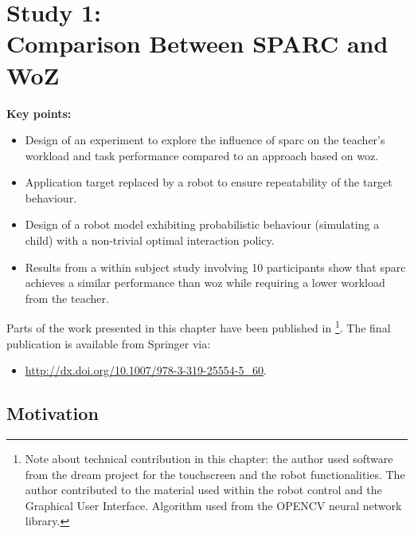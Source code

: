 \chapter[Study 1: Comparison Between SPARC and WoZ]{Study 1: \\ Comparison Between SPARC and WoZ}\label{chap:woz}
\glsresetall
\graphicspath{{images/woz/}}

\begin{framed}
	\textbf{Key points:}
	
	\begin{itemize}
		\item Design of an experiment to explore the influence of \acrshort{sparc} on the teacher's workload and task performance compared to an approach based on \acrshort{woz}.
		\item Application target replaced by a robot to ensure repeatability of the target behaviour.
		\item Design of a robot model exhibiting probabilistic behaviour (simulating a child) with a non-trivial optimal interaction policy.
		\item Results from a within subject study involving 10 participants show that \acrshort{sparc} achieves a similar performance than \acrshort{woz} while requiring a lower workload from the teacher.
	\end{itemize}
\end{framed}

Parts of the work presented in this chapter have been published in \cite{senft2015sparc}\footnote{Note about technical contribution in this chapter: the author used software from the \acrshort{dream} project for the touchscreen and the robot functionalities. The author contributed to the material used within the robot control and the Graphical User Interface. Algorithm used from the OPENCV neural network library.}. The final publication is available from Springer via:
\begin{itemize}
	\item \url{http://dx.doi.org/10.1007/978-3-319-25554-5_60}.
\end{itemize} 

\newpage

\section{Motivation}

